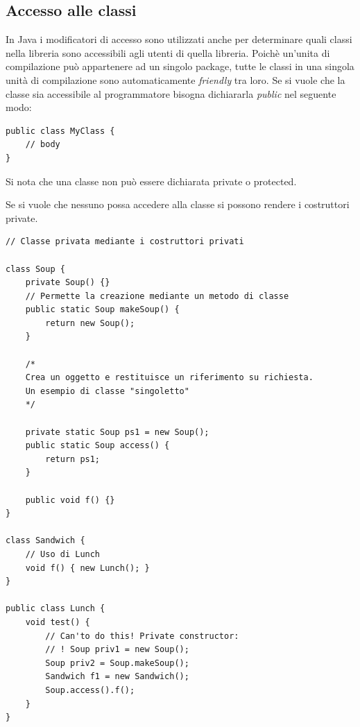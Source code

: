 \documentclass[12pt]{report}
\begin{document}
\subsection{Accesso alle classi}
In Java i modificatori di accesso sono utilizzati anche per determinare quali classi nella libreria sono accessibili agli utenti di quella libreria. Poichè un'unita di compilazione può appartenere ad un singolo package, tutte le classi in una singola unità di compilazione sono automaticamente \textit{friendly} tra loro. Se si vuole che la classe sia accessibile al programmatore bisogna dichiararla \textit{public} nel seguente modo:
\begin{lstlisting}[style=javastyle]
public class MyClass {
	// body
}
\end{lstlisting}
\begin{note}{}{}
Si nota che una classe non può essere dichiarata private o protected.
\end{note}
Se si vuole che nessuno possa accedere alla classe si possono rendere i costruttori private.
\begin{example}{}{}
\begin{lstlisting}[style=javastyle]
// Classe privata mediante i costruttori privati

class Soup {
	private Soup() {}
	// Permette la creazione mediante un metodo di classe
	public static Soup makeSoup() {
		return new Soup();
	}

	/*
	Crea un oggetto e restituisce un riferimento su richiesta.
	Un esempio di classe "singoletto"
	*/

	private static Soup ps1 = new Soup();
	public static Soup access() {
		return ps1;
	}

	public void f() {}
}

class Sandwich {
	// Uso di Lunch
	void f() { new Lunch(); }
}

public class Lunch {
	void test() {
		// Can'to do this! Private constructor:
		// ! Soup priv1 = new Soup();
		Soup priv2 = Soup.makeSoup();
		Sandwich f1 = new Sandwich();
		Soup.access().f();
	}
}
\end{lstlisting}
\end{example}
\end{document}
